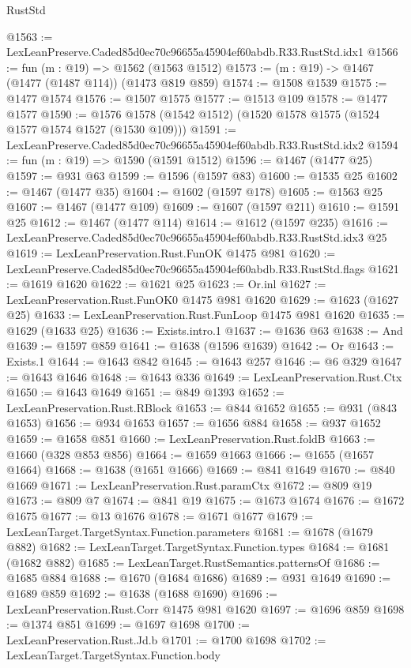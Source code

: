 \begin{lexlean}{RustStd}
\begin{coremodule}
@1563 := LexLeanPreserve.Caded85d0ec70c96655a45904ef60abdb.R33.RustStd.idx1
@1566 := fun (m : @19) => @1562 (@1563 @1512)
@1573 := (m : @19) -> @1467 (@1477 (@1487 @114)) (@1473 @819 @859)
@1574 := @1508 @1539
@1575 := @1477 @1574
@1576 := @1507 @1575
@1577 := @1513 @109
@1578 := @1477 @1577
@1590 := @1576 @1578 (@1542 @1512) (@1520 @1578 @1575 (@1524 @1577 @1574 @1527 (@1530 @109)))
@1591 := LexLeanPreserve.Caded85d0ec70c96655a45904ef60abdb.R33.RustStd.idx2
@1594 := fun (m : @19) => @1590 (@1591 @1512)
@1596 := @1467 (@1477 @25)
@1597 := @931 @63
@1599 := @1596 (@1597 @83)
@1600 := @1535 @25
@1602 := @1467 (@1477 @35)
@1604 := @1602 (@1597 @178)
@1605 := @1563 @25
@1607 := @1467 (@1477 @109)
@1609 := @1607 (@1597 @211)
@1610 := @1591 @25
@1612 := @1467 (@1477 @114)
@1614 := @1612 (@1597 @235)
@1616 := LexLeanPreserve.Caded85d0ec70c96655a45904ef60abdb.R33.RustStd.idx3 @25
@1619 := LexLeanPreservation.Rust.FunOK @1475 @981
@1620 := LexLeanPreserve.Caded85d0ec70c96655a45904ef60abdb.R33.RustStd.flags
@1621 := @1619 @1620
@1622 := @1621 @25
@1623 := Or.inl
@1627 := LexLeanPreservation.Rust.FunOK0 @1475 @981 @1620
@1629 := @1623 (@1627 @25)
@1633 := LexLeanPreservation.Rust.FunLoop @1475 @981 @1620
@1635 := @1629 (@1633 @25)
@1636 := Exists.intro.{1}
@1637 := @1636 @63
@1638 := And
@1639 := @1597 @859
@1641 := @1638 (@1596 @1639)
@1642 := Or
@1643 := Exists.{1}
@1644 := @1643 @842
@1645 := @1643 @257
@1646 := @6 @329
@1647 := @1643 @1646
@1648 := @1643 @336
@1649 := LexLeanPreservation.Rust.Ctx
@1650 := @1643 @1649
@1651 := @849 @1393
@1652 := LexLeanPreservation.Rust.RBlock
@1653 := @844 @1652
@1655 := @931 (@843 @1653)
@1656 := @934 @1653
@1657 := @1656 @884
@1658 := @937 @1652
@1659 := @1658 @851
@1660 := LexLeanPreservation.Rust.foldB
@1663 := @1660 (@328 @853 @856)
@1664 := @1659 @1663
@1666 := @1655 (@1657 @1664)
@1668 := @1638 (@1651 @1666)
@1669 := @841 @1649
@1670 := @840 @1669
@1671 := LexLeanPreservation.Rust.paramCtx
@1672 := @809 @19
@1673 := @809 @7
@1674 := @841 @19
@1675 := @1673 @1674
@1676 := @1672 @1675
@1677 := @13 @1676
@1678 := @1671 @1677
@1679 := LexLeanTarget.TargetSyntax.Function.parameters
@1681 := @1678 (@1679 @882)
@1682 := LexLeanTarget.TargetSyntax.Function.types
@1684 := @1681 (@1682 @882)
@1685 := LexLeanTarget.RustSemantics.patternsOf
@1686 := @1685 @884
@1688 := @1670 (@1684 @1686)
@1689 := @931 @1649
@1690 := @1689 @859
@1692 := @1638 (@1688 @1690)
@1696 := LexLeanPreservation.Rust.Corr @1475 @981 @1620
@1697 := @1696 @859
@1698 := @1374 @851
@1699 := @1697 @1698
@1700 := LexLeanPreservation.Rust.Jd.b
@1701 := @1700 @1698
@1702 := LexLeanTarget.TargetSyntax.Function.body

\end{coremodule}
\end{lexlean}
